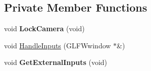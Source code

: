 \subsection*{Private Member Functions}
\begin{DoxyCompactItemize}
\item 
void {\bfseries Lock\+Camera} (void)\hypertarget{class_camera_abff5b93c71289be007f966060ff9a70d}{}\label{class_camera_abff5b93c71289be007f966060ff9a70d}

\item 
void \hyperlink{class_camera_a63bf578388a6ea87d2d0a250f91198ab}{Handle\+Inputs} (G\+L\+F\+Wwindow $\ast$\&)
\item 
void {\bfseries Get\+External\+Inputs} (void)\hypertarget{class_camera_ae26cc8359a03e57b9f26c149574e920d}{}\label{class_camera_ae26cc8359a03e57b9f26c149574e920d}

\end{DoxyCompactItemize}
